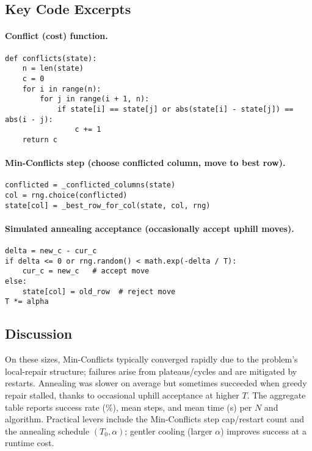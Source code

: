 \documentclass[11pt,a4paper]{article}
\begin{document}
\subsection*{Key Code Excerpts}

\paragraph{Conflict (cost) function.}
\begin{lstlisting}[style=mypython,caption={Number of attacking pairs},label={lst:conflicts}]
def conflicts(state):
    n = len(state)
    c = 0
    for i in range(n):
        for j in range(i + 1, n):
            if state[i] == state[j] or abs(state[i] - state[j]) == abs(i - j):
                c += 1
    return c
\end{lstlisting}

\paragraph{Min-Conflicts step (choose conflicted column, move to best row).}
\begin{lstlisting}[style=mypython,caption={Min-Conflicts local repair step},label={lst:minc-step}]
conflicted = _conflicted_columns(state)
col = rng.choice(conflicted)
state[col] = _best_row_for_col(state, col, rng)
\end{lstlisting}

\paragraph{Simulated annealing acceptance (occasionally accept uphill moves).}
\begin{lstlisting}[style=mypython,caption={Annealing acceptance rule},label={lst:anneal-accept}]
delta = new_c - cur_c
if delta <= 0 or rng.random() < math.exp(-delta / T):
    cur_c = new_c   # accept move
else:
    state[col] = old_row  # reject move
T *= alpha
\end{lstlisting}

\subsection{Discussion}
On these sizes, Min-Conflicts typically converged rapidly due to the problem's local-repair structure; failures arise from plateaus/cycles and are mitigated by restarts. Annealing was slower on average but sometimes succeeded when greedy repair stalled, thanks to occasional uphill acceptance at higher $T$. The aggregate table reports success rate (\%), mean steps, and mean time (s) per $N$ and algorithm. Practical levers include the Min-Conflicts step cap/restart count and the annealing schedule $(T_0,\alpha)$; gentler cooling (larger $\alpha$) improves success at a runtime cost.
\end{document}
